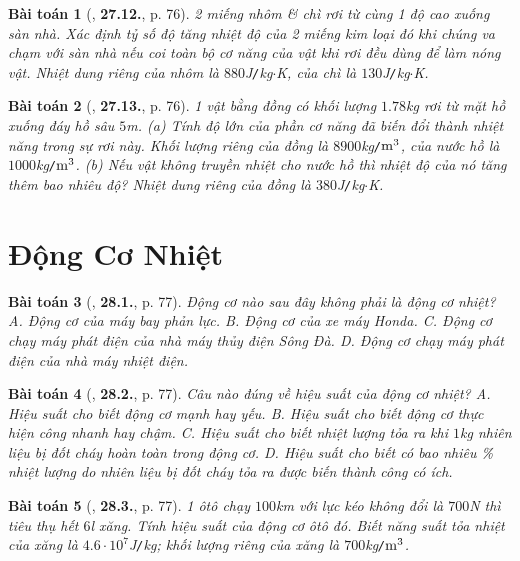 \documentclass{article}
\numberwithin{equation}{section}
\newtheorem{baitoan}{Bài toán}
\begin{document}
\begin{baitoan}[\cite{SBT_Vat_Ly_8}, \textbf{27.12.}, p. 76]
	2 miếng nhôm \& chì rơi từ cùng 1 độ cao xuống sàn nhà. Xác định tỷ số độ tăng nhiệt độ của 2 miếng kim loại đó khi chúng va chạm với sàn nhà nếu coi toàn bộ cơ năng của vật khi rơi đều dùng để làm nóng vật. Nhiệt dung riêng của nhôm là $880$\emph{J\texttt{/}kg$\cdot$K}, của chì là $130$\emph{J\texttt{/}kg$\cdot$K}.
\end{baitoan}

\begin{baitoan}[\cite{SBT_Vat_Ly_8}, \textbf{27.13.}, p. 76]
	1 vật bằng đồng có khối lượng $1.78$\emph{kg} rơi từ mặt hồ xuống đáy hồ sâu $5$\emph{m}. (a) Tính độ lớn của phần cơ năng đã biến đổi thành nhiệt năng trong sự rơi này. Khối lượng riêng của đồng là $8900$\emph{kg\texttt{/}$\rm m^3$}, của nước hồ là $1000$\emph{kg\texttt{/}$\rm m^3$}. (b) Nếu vật không truyền nhiệt cho nước hồ thì nhiệt độ của nó tăng thêm bao nhiêu độ? Nhiệt dung riêng của đồng là $380$\emph{J\texttt{/}kg$\cdot$K}.
\end{baitoan}


\section{Động Cơ Nhiệt}

\begin{baitoan}[\cite{SBT_Vat_Ly_8}, \textbf{28.1.}, p. 77]
	Động cơ nào sau đây không phải là động cơ nhiệt? {\sf A.} Động cơ của máy bay phản lực. {\sf B.} Động cơ của xe máy Honda. {\sf C.} Động cơ chạy máy phát điện của nhà máy thủy điện Sông Đà. {\sf D.} Động cơ chạy máy phát điện của nhà máy nhiệt điện.
\end{baitoan}

\begin{baitoan}[\cite{SBT_Vat_Ly_8}, \textbf{28.2.}, p. 77]
	Câu nào đúng về hiệu suất của động cơ nhiệt? {\sf A.} Hiệu suất cho biết động cơ mạnh hay yếu. {\sf B.} Hiệu suất cho biết động cơ thực hiện công nhanh hay chậm. {\sf C.} Hiệu suất cho biết nhiệt lượng tỏa ra khi $1$\emph{kg} nhiên liệu bị đốt cháy hoàn toàn trong động cơ. {\sf D.} Hiệu suất cho biết có bao nhiêu \% nhiệt lượng do nhiên liệu bị đốt cháy tỏa ra được biến thành công có ích.
\end{baitoan}

\begin{baitoan}[\cite{SBT_Vat_Ly_8}, \textbf{28.3.}, p. 77]
	1 ôtô chạy $100$\emph{km} với lực kéo không đổi là $700$\emph{N} thì tiêu thụ hết $6$\emph{l} xăng. Tính hiệu suất của động cơ ôtô đó. Biết năng suất tỏa nhiệt của xăng là $4.6\cdot10^7$\emph{J\texttt{/}kg}; khối lượng riêng của xăng là $700$\emph{kg\texttt{/}$\rm m^3$}.
\end{baitoan}
\end{document}
